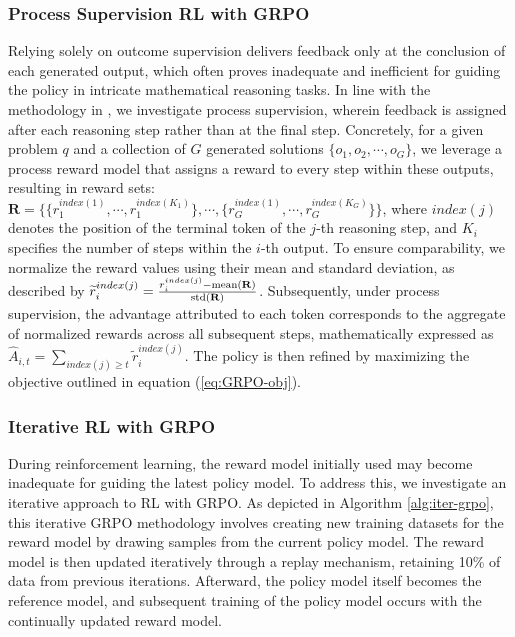 \begin{itemize}[topsep=0pt]
\subsubsection{Process Supervision RL with GRPO} Relying solely on outcome supervision delivers feedback only at the conclusion of each generated output, which often proves inadequate and inefficient for guiding the policy in intricate mathematical reasoning tasks. In line with the methodology in \cite{wang2023math}, we investigate process supervision, wherein feedback is assigned after each reasoning step rather than at the final step. Concretely, for a given problem $q$ and a collection of $G$ generated solutions $\{o_1, o_2, \cdots, o_G\}$, we leverage a process reward model that assigns a reward to every step within these outputs, resulting in reward sets: $\mathbf{R} = \{ \{r_1^{index(1)},\cdots,r_1^{index(K_1)}\}, \cdots,  \{r_G^{index(1)},\cdots,r_G^{index(K_G)}\} \}$, where $index(j)$ denotes the position of the terminal token of the $j$-th reasoning step, and $K_i$ specifies the number of steps within the $i$-th output. To ensure comparability, we normalize the reward values using their mean and standard deviation, as described by $\widetilde{r}_i^{index(j)} = \frac{r_i^{index(j)} - {\rm mean(\mathbf{R})}}{{\rm std(\mathbf{R})}}$.
Subsequently, under process supervision, the advantage attributed to each token corresponds to the aggregate of normalized rewards across all subsequent steps, mathematically expressed as $\hat{A}_{i, t} = \sum_{index(j) \ge t} \widetilde{r}_i^{index(j)}$.
The policy is then refined by maximizing the objective outlined in equation (\ref{eq:GRPO-obj}).

\subsubsection{Iterative RL with GRPO} During reinforcement learning, the reward model initially used may become inadequate for guiding the latest policy model. To address this, we investigate an iterative approach to RL with GRPO. As depicted in Algorithm \ref{alg:iter-grpo}, this iterative GRPO methodology involves creating new training datasets for the reward model by drawing samples from the current policy model. The reward model is then updated iteratively through a replay mechanism, retaining 10\% of data from previous iterations. Afterward, the policy model itself becomes the reference model, and subsequent training of the policy model occurs with the continually updated reward model.


\end{itemize}
